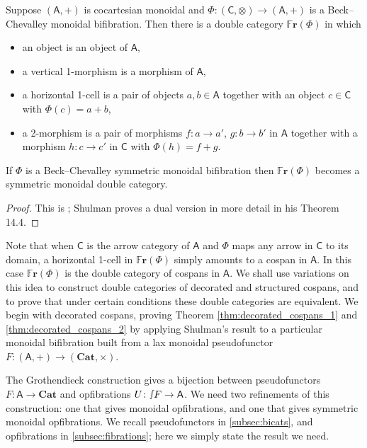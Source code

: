 \documentclass[ a4paper, onecolumn, superscriptaddress,10pt, accepted=2022-02-14, issue=3, volume=4, shorttitle=papers/compositionality-4-3 ]{compositionalityarticle}
\let\maps\colon
\newcommand{\A}{\mathsf{A}}
\newcommand{\C}{\mathsf{C}}
\newcommand{\bicat}{\mathbf}
\newcommand{\Cat}{\bicat{Cat}}
\newcommand{\double}[1]{\mathbf{\mathbb #1}}
\newcommand{\Fr}{\double{Fr}}
\newcommand{\inta}{\raisebox{.3\depth}{$\smallint\hspace{-.01in}$}}
\begin{document}
\begin{lem} \label{lem:shulman}
Suppose $(\A,+)$ is cocartesian monoidal and $\Phi \maps (\C,\otimes) \to (\A,+)$ is a Beck--Chevalley monoidal bifibration.  Then there is a double category $\Fr(\Phi)$ in which

\begin{itemize}
\item an object is an object of $\A$,
\item a vertical 1-morphism is a morphism of $\A$,
\item a horizontal 1-cell is a pair of objects $a,b \in \A$ together with an
object $c \in \C$ with $\Phi(c) = a + b$,
\item a 2-morphism is a pair of morphisms $f \maps a \to a'$, $g \maps b \to b'$
in $\A$ together with a morphism $h \maps c \to c'$ in $\C$ with $\Phi(h) = f + g$.
\end{itemize}
If $\Phi$ is a Beck--Chevalley symmetric monoidal bifibration then $\Fr(\Phi)$ becomes a symmetric
monoidal double category.
\end{lem}

\begin{proof} This is \cite[Theorem 14.9]{Shulman2008}; Shulman proves a dual version in more detail in his Theorem 14.4.
\end{proof}

Note that when $\C$ is the arrow category of $\A$ and $\Phi$ maps any arrow in $\C$ to its
domain, a horizontal 1-cell in $\Fr(\Phi)$ simply amounts to a cospan in $\A$. In this case $\Fr(\Phi)$ is the double category of cospans in $\A$.    We shall use variations on this idea to construct double categories of decorated and structured cospans, and to prove that under certain conditions these double categories are equivalent.    We begin with decorated cospans, proving Theorem \ref{thm:decorated_cospans_1} and \ref{thm:decorated_cospans_2} by applying Shulman's result to a particular monoidal bifibration built from a lax monoidal pseudofunctor $F \maps (\A,+) \to (\Cat,\times)$.

The Grothendieck construction gives a bijection between pseudofunctors $F \maps \A \to \Cat$ and opfibrations $U \maps \inta F \to \A$.  We need two refinements of this construction: one that gives monoidal opfibrations, and one that gives symmetric monoidal opfibrations.  We recall pseudofunctors in \cref{subsec:bicats}, and opfibrations in \cref{subsec:fibrations}; here we simply state the result we need.
\end{document}

